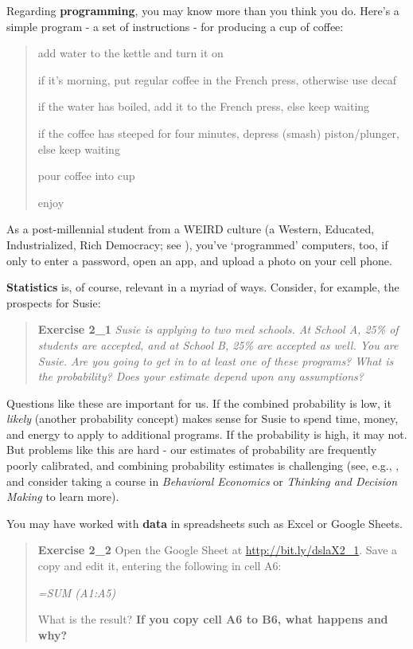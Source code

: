 \documentclass[openany]{book}
\begin{document}
Regarding \textbf{programming}, you may know more than you think you do. Here's a simple program - a set of instructions - for producing a cup of coffee:

\begin{quote}
add water to the kettle and turn it on

if it's morning, put regular coffee in the French press, otherwise use decaf

if the water has boiled, add it to the French press, else keep waiting

if the coffee has steeped for four minutes, depress (smash) piston/plunger, else keep waiting

pour coffee into cup

enjoy
\end{quote}

As a post-millennial student from a WEIRD culture (a Western, Educated, Industrialized, Rich Democracy; see \citet{henrich2010weirdest}), you've `programmed' computers, too, if only to enter a password, open an app, and upload a photo on your cell phone.

\textbf{Statistics} is, of course, relevant in a myriad of ways. Consider, for example, the prospects for Susie:

\begin{quote}
\textbf{Exercise 2\_1}
\emph{Susie is applying to two med schools. At School A, 25\% of students are accepted, and at School B, 25\% are accepted as well. You are Susie. Are you going to get in to at least one of these programs? What is the probability? Does your estimate depend upon any assumptions?}
\end{quote}

Questions like these are important for us. If the combined probability is low, it \emph{likely} (another probability concept) makes sense for Susie to spend time, money, and energy to apply to additional programs. If the probability is high, it may not. But problems like this are hard - our estimates of probability are frequently poorly calibrated, and combining probability estimates is challenging (see, e.g., \citet{tversky1974judgment}, and consider taking a course in \emph{Behavioral Economics} or \emph{Thinking and Decision Making} to learn more).

You may have worked with \textbf{data} in spreadsheets such as Excel or Google Sheets.

\begin{quote}
\textbf{Exercise 2\_2}
Open the Google Sheet at \url{http://bit.ly/dslaX2_1}. Save a copy and edit it, entering the following in cell A6:

\emph{=SUM (A1:A5)}

What is the result? \textbf{If you copy cell A6 to B6, what happens and why?}
\end{quote}
\end{document}
